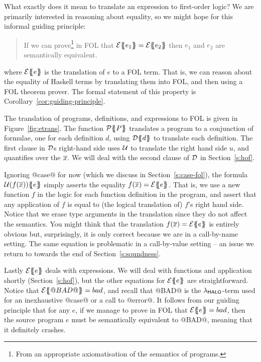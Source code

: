 What exactly does it mean to translate an expression to first-order logic?
We are primarily interested in reasoning about equality, so we might
hope for this informal guiding principle:

\begin{quote}
If we can prove\footnote{From an appropriate axiomatisation of the semantics of 
programs.} in FOL that $\etrans{}{}{e_1} = \etrans{}{}{e_2}$ then
$e_1$ and $e_2$ are semantically equivalent.
\end{quote}

where $\etrans{}{}{e}$ is the translation of $e$ to a FOL term. That is, we can
reason about the equality of Haskell terms by translating them into FOL, and then using
a FOL theorem prover. The formal statement of this property is Corollary~\ref{cor:guiding-principle}.

The translation of programs, definitions, and expressions to FOL
is given in Figure~\ref{fig:etrans}.
The function $\ptrans{}{P}$ translates a program to a conjunction of formulae,
one for each definition $d$, using $\dtrans{}{d}$ to translate
each definition.
The first clause in $\cal D$s right-hand side uses $\cal U$ to 
translate the right hand side $u$, and quantifies over the $\ol{x}$.  
We will deal with the second clause of $\cal D$
in Section~\ref{s:hof}.

Ignoring @case@ for now (which we discuss in Section~\ref{s:case-fol}),
the formula $\utrans{}{e}{f(\ol{x})}$
simply asserts the equality $f(\ol{x}) = \etrans{}{}{e}$.
That is, we use a new function $f$ in the logic for each function definition in the
program, and assert that any application of $f$ is equal to (the logical translation of)
$f$'s right hand side. Notice that we erase type arguments in the translation
since they do not affect the semantics. You might think that the translation 
$f(\ol{x}) = \etrans{}{}{e}$ is entirely obvious but, surprisingly, it is only correct 
because we are in a call-by-name setting. The same equation is problematic in a 
call-by-value setting -- an issue 
we return to towards the end of Section~\ref{s:soundness}.

Lastly $\etrans{}{}{e}$ deals with expressions.  We will deal with
functions and application shortly
(Section~\ref{s:hof}), but the other equations for $\etrans{}{}{e}$
are straightforward.  Notice that $\etrans{}{}{@BAD@} = bad$, and recall
that @BAD@ is the $\theLang$-term used for an inexhaustive @case@ or a call
to @error@.  It follows from our guiding principle
that for any $e$, if we manage to prove in FOL that $ \etrans{}{}{e} = bad $, 
then the source program $e$
must be semantically equivalent to @BAD@, meaning that it definitely
crashes.

